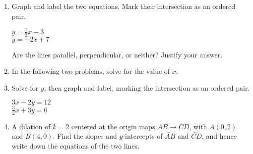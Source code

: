 \documentclass[12pt, twoside]{article}
\begin{document}
\begin{enumerate}
  
\newpage

\item Graph and label the two equations. Mark their intersection as an ordered pair.

  \begin{multicols}{2}
    $y = \frac{1}{2}x-3$ \\
    $y = -2x + 7$
  \end{multicols}
  Are the lines parallel, perpendicular, or neither? Justify your answer.
  \vspace{1.5cm}

  \begin{center} %
  \end{center}

\item In the following two problems, solve for the value of $x$.
\begin{enumerate}
\end{enumerate}

\newpage
\item Solve for $y$, then graph and label, marking the intersection as an ordered pair.
        \vspace{0.25cm}
        \begin{multicols}{2}
          $3x - 2y =  12$\\
          $\displaystyle \frac{3}{2} x + 3y = 6$
        \end{multicols}
        \vspace{2.25cm}

    \begin{center} %
    \end{center}

\item A dilation of $k=2$ centered at the origin maps $\overline{AB} \rightarrow \overline{CD}$, with $A(0,2)$ and $B(4,0)$. Find the slopes and $y$-intercepts of $\overleftrightarrow{AB}$ and $\overleftrightarrow{CD}$, and hence write down the equations of the two lines.

\end{enumerate}
\end{document}
